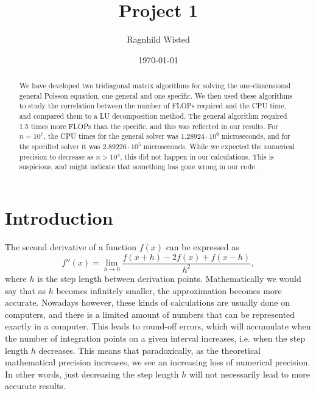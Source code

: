 \documentclass[english, nofootinbib]{revtex4-1}  %
\begin{document}
\title{Project 1}
\date{\today}               
\author{Ragnhild Wisted}


\newpage

\begin{abstract}
We have developed two tridiagonal matrix algorithms for solving the one-dimensional general Poisson equation, one general and one specific. We then used these algorithms to study the correlation between the number of FLOPs required and the CPU time, and compared them to a LU decomposition method. The general algorithm required 1.5 times more FLOPs than the specific, and this was reflected in our results. For $n = 10^7$, the CPU times for the general solver was $1.28924\cdot 10^6$ microseconds, and for the specified solver it was $2.89226\cdot 10^5$ microseconds. While we expected the numerical precision to decrease as $n > 10^4$, this did not happen in our calculations. This is suspicious, and might indicate that something has gone wrong in our code.
\end{abstract}


\maketitle                                %
\section{Introduction}
The second derivative of a function $f(x)$ can be expressed as
\begin{equation} \label{eq: second derivative}
f''(x) = \lim_{h\rightarrow 0}\frac{f(x+h)-2f(x)+f(x-h)}{h^2},
\end{equation}
where $h$ is the step length between derivation points. Mathematically we would say that as $h$ becomes infinitely smaller, the approximation becomes more accurate. Nowadays however, these kinds of calculations are usually done on computers, and there is a limited amount of numbers that can be represented exactly in a computer. This leads to round-off errors, which will  accumulate when the number of integration points on a given interval increases, i.e. when the step length $h$ decreases. This means that paradoxically, as the theoretical mathematical precision increases, we see an increasing loss of numerical precision. In other words, just decreasing the step length $h$ will not necessarily lead to more accurate results.  
\end{document}

